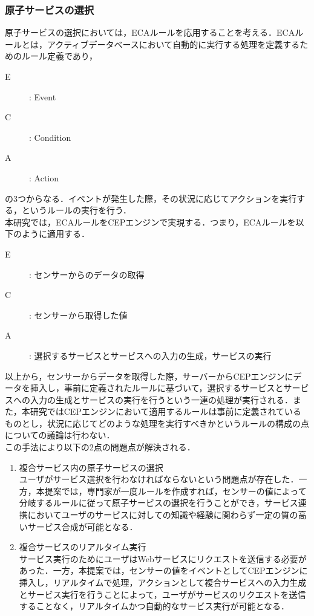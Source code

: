 \documentclass{kuisthesis}			%
\begin{document}
\subsubsection{原子サービスの選択}
原子サービスの選択においては，ECAルールを応用することを考える．ECAルールとは，アクティブデータベースにおいて自動的に実行する処理を定義するためのルール定義であり，
\begin{description}
\item[E] : Event
\item[C] : Condition
\item[A] : Action
\end{description}
の3つからなる．イベントが発生した際，その状況に応じてアクションを実行する，というルールの実行を行う．\\
本研究では，ECAルールをCEPエンジンで実現する．つまり，ECAルールを以下のように適用する．
\begin{description}
\item[E] : センサーからのデータの取得
\item[C] : センサーから取得した値
\item[A] : 選択するサービスとサービスへの入力の生成，サービスの実行
\end{description}
以上から，センサーからデータを取得した際，サーバーからCEPエンジンにデータを挿入し，事前に定義されたルールに基づいて，選択するサービスとサービスへの入力の生成とサービスの実行を行うという一連の処理が実行される．また，本研究ではCEPエンジンにおいて適用するルールは事前に定義されているものとし，状況に応じてどのような処理を実行すべきかというルールの構成の点についての議論は行わない．\\
この手法により以下の2点の問題点が解決される．
\begin{enumerate}
\item 複合サービス内の原子サービスの選択\\
ユーザがサービス選択を行わなければならないという問題点が存在した．一方，本提案では，専門家が一度ルールを作成すれば，センサーの値によって分岐するルールに従って原子サービスの選択を行うことができ，サービス連携においてユーザのサービスに対しての知識や経験に関わらず一定の質の高いサービス合成が可能となる．
\item 複合サービスのリアルタイム実行\\
サービス実行のためにユーザはWebサービスにリクエストを送信する必要があった．一方，本提案では，センサーの値をイベントとしてCEPエンジンに挿入し，リアルタイムで処理，アクションとして複合サービスへの入力生成とサービス実行を行うことによって，ユーザがサービスのリクエストを送信することなく，リアルタイムかつ自動的なサービス実行が可能となる．
\end{enumerate}
\end{document}

